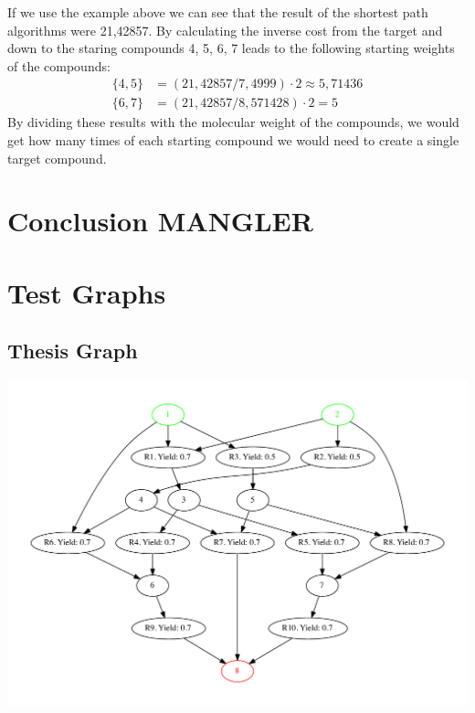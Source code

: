 \documentclass[a4paper,10pt,titlepage]{paper}
\begin{document}
If we use the example above we can see that the result of the shortest path algorithms were 21,42857. By calculating the inverse cost from the target and down to the staring compounds 4, 5, 6, 7 leads to the following starting weights of the compounds:
\begin{align}
\{4,5\} &= (21,42857/7,4999) \cdot 2 \approx 5,71436\\
\{6,7\} &= (21,42857/8,571428) \cdot 2 = 5
\end{align}
By dividing these results with the molecular weight of the compounds, we would get how many times of each starting compound we would need to create a single target compound.
\section{Conclusion MANGLER}
\label{sec::Conclusion}

\newpage

\printbibliography[type=book, title={Books}]
\printbibliography[type=article, title={Articles}]
\printbibliography[nottype=book, nottype=article, title={Other}]

\newpage
\appendix
{}
\section{Test Graphs}

\subsection{Thesis Graph}
\centering
\includegraphics[scale=0.4]{TestGrafer/ThesisTest.pdf}
\label{Appendix::ThesisGraph}
\end{document}
